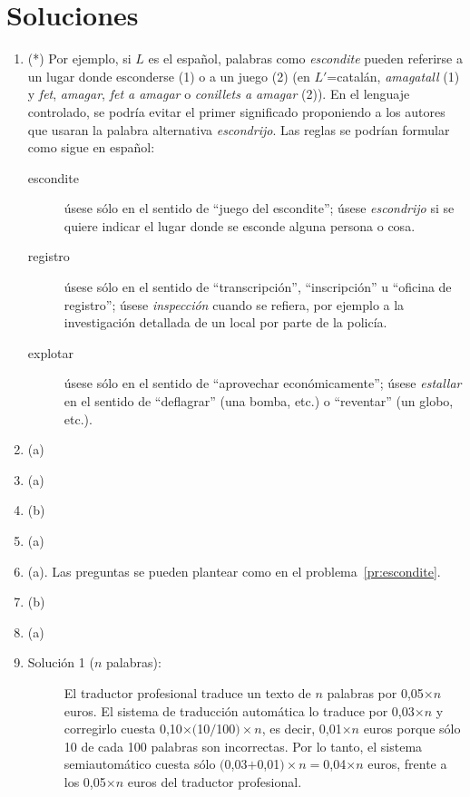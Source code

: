 \section{Soluciones} \begin{enumerate} \item(*) \label{pr:escondite} Por ejemplo, si $L$ es el español, palabras como {\em escondite} pueden referirse a un lugar donde esconderse (1) o a un juego (2) (en $L'$=catalán, \emph{amagatall} (1) y \emph{fet}, {\em amagar}, \emph{fet a amagar} o \emph{conillets a amagar} (2)). En el lenguaje controlado, se podría evitar el primer significado proponiendo a los autores que usaran la palabra alternativa {\em escondrijo}. Las reglas se podrían formular como sigue en español: {\sl \begin{description} \item[escondite] úsese sólo en el sentido de ``juego del escondite''; úsese \emph{escondrijo} si se quiere indicar el lugar donde se esconde alguna persona o cosa. \item[registro] úsese sólo en el sentido de ``transcripción'', ``inscripción'' u ``oficina de registro''; úsese \emph{inspección} cuando se refiera, por ejemplo a la investigación detallada de un local por parte de la policía. \item[explotar] úsese sólo en el sentido de ``aprovechar económicamente''; úsese \emph{estallar} en el sentido de ``deflagrar'' (una bomba, etc.) o ``reventar'' (un globo, etc.). \end{description} } \item (a) \item (a) \item (b) \item (a) 

\item (a). Las preguntas se pueden plantear como en el problema~\ref{pr:escondite}. \item (b) \item (a) \item

\begin{description} \item [Solución 1 ($n$ palabras):] El traductor profesional traduce un texto de $n$ palabras por 0,05$\times n$ euros. El sistema de traducción automática lo traduce por 0,03$\times n$ y corregirlo cuesta 0,10$\times($10$/$100$)\times n$, es decir, 0,01$\times n$ euros porque sólo 10 de cada 100 palabras son incorrectas. Por lo tanto, el sistema semiautomático cuesta sólo $($0,03$+$0,01$)\times n = $0,04$\times n$ euros, frente a los 0,05$\times n$ euros del traductor profesional. 


\end{description}
\end{enumerate}
